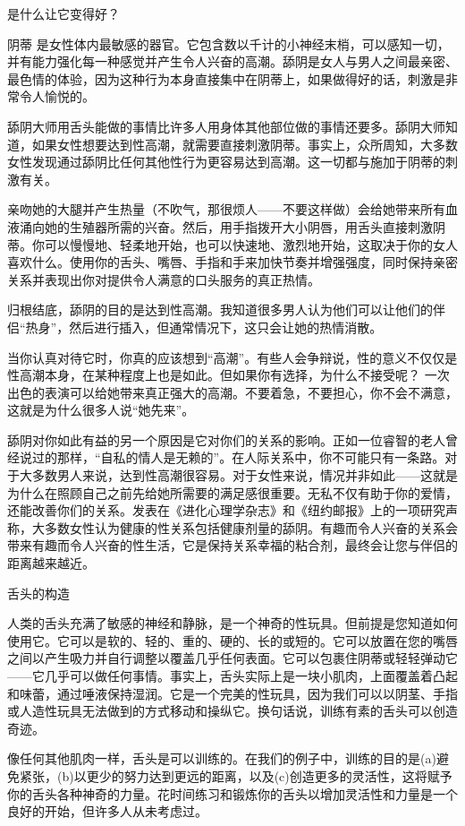 \documentclass[12pt,UTF8]{ctexbook}
\begin{document}
是什么让它变得好？

阴蒂 是女性体内最敏感的器官。它包含数以千计的小神经末梢，可以感知一切，并有能力强化每一种感觉并产生令人兴奋的高潮。舔阴是女人与男人之间最亲密、最色情的体验，因为这种行为本身直接集中在阴蒂上，如果做得好的话，刺激是非常令人愉悦的。

舔阴大师用舌头能做的事情比许多人用身体其他部位做的事情还要多。舔阴大师知道，如果女性想要达到性高潮，就需要直接刺激阴蒂。事实上，众所周知，大多数女性发现通过舔阴比任何其他性行为更容易达到高潮。这一切都与施加于阴蒂的刺激有关。

亲吻她的大腿并产生热量（不吹气，那很烦人——不要这样做）会给她带来所有血液涌向她的生殖器所需的兴奋。然后，用手指拨开大小阴唇，用舌头直接刺激阴蒂。你可以慢慢地、轻柔地开始，也可以快速地、激烈地开始，这取决于你的女人喜欢什么。使用你的舌头、嘴唇、手指和手来加快节奏并增强强度，同时保持亲密关系并表现出你对提供令人满意的口头服务的真正热情。

归根结底，舔阴的目的是达到性高潮。我知道很多男人认为他们可以让他们的伴侣“热身”，然后进行插入，但通常情况下，这只会让她的热情消散。

当你认真对待它时，你真的应该想到“高潮”。有些人会争辩说，性的意义不仅仅是性高潮本身，在某种程度上也是如此。但如果你有选择，为什么不接受呢？ 一次出色的表演可以给她带来真正强大的高潮。不要着急，不要担心，你不会不满意，这就是为什么很多人说“她先来”。

舔阴对你如此有益的另一个原因是它对你们的关系的影响。正如一位睿智的老人曾经说过的那样，“自私的情人是无赖的”。在人际关系中，你不可能只有一条路。对于大多数男人来说，达到性高潮很容易。对于女性来说，情况并非如此——这就是为什么在照顾自己之前先给她所需要的满足感很重要。无私不仅有助于你的爱情，还能改善你们的关系。发表在《进化心理学杂志》和《纽约邮报》上的一项研究声称，大多数女性认为健康的性关系包括健康剂量的舔阴。有趣而令人兴奋的关系会带来有趣而令人兴奋的性生活，它是保持关系幸福的粘合剂，最终会让您与伴侣的距离越来越近。

舌头的构造

人类的舌头充满了敏感的神经和静脉，是一个神奇的性玩具。但前提是您知道如何使用它。它可以是软的、轻的、重的、硬的、长的或短的。它可以放置在您的嘴唇之间以产生吸力并自行调整以覆盖几乎任何表面。它可以包裹住阴蒂或轻轻弹动它——它几乎可以做任何事情。事实上，舌头实际上是一块小肌肉，上面覆盖着凸起和味蕾，通过唾液保持湿润。它是一个完美的性玩具，因为我们可以以阴茎、手指或人造性玩具无法做到的方式移动和操纵它。换句话说，训练有素的舌头可以创造奇迹。

像任何其他肌肉一样，舌头是可以训练的。在我们的例子中，训练的目的是(a)避免紧张，(b)以更少的努力达到更远的距离，以及(c)创造更多的灵活性，这将赋予你的舌头各种神奇的力量。花时间练习和锻炼你的舌头以增加灵活性和力量是一个良好的开始，但许多人从未考虑过。
\end{document}
